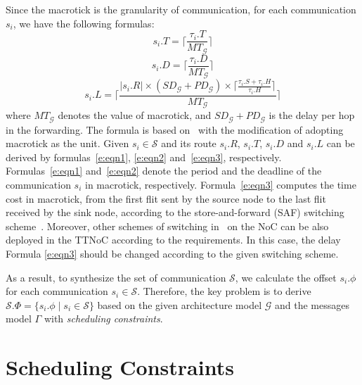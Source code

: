 \documentclass[journal]{IEEEtran}
\newcommand{\calG}{\mathcal{G}}
\newcommand{\calS}{\mathcal{S}}
\newcommand{\SD}{\mathit{SD}_\calG}
\newcommand{\HD}{\mathit{PD}_\calG}
\newcommand{\MT}{\mathit{MT}_\calG}
\theoremstyle{remark}
\begin{document}
Since the macrotick is the granularity of communication,
 for each communication $s_{i}$,
   we have the following formulas:
\begin{equation}
\label{e:eqn1}
  s_i.T = \lceil\frac{\tau_{i}.T}{\MT} \rceil
\end{equation}
\begin{equation}
\label{e:eqn2}
  s_i.D = \lceil\frac{\tau_{i}.D}{\MT}\rceil
\end{equation}
\begin{equation}
\label{e:eqn3}
  s_i.L = \lceil\frac{|s_i.R| \times (\SD+\HD) \times
    \lceil\frac{\tau_{i}.S + \tau_{i}.H}{\tau_{i}.H  }\rceil}{\MT}\rceil
\end{equation}   
where $\MT$ denotes the value of macrotick,
 and $\SD+\HD$ is the delay per hop in the forwarding.
The formula is based on~\cite{DBLP:books/daglib/0087651} with the modification of adopting macrotick as the unit.  
Given $s_{i}\in\calS$ and its route $s_i.R$,
 $s_i.T$,
  $s_i.D$ and $s_i.L$ can be derived by formulas~\ref{e:eqn1},
   \ref{e:eqn2} and~\ref{e:eqn3}, respectively.
Formulas~\ref{e:eqn1} and~\ref{e:eqn2} denote the period and the deadline of the communication $s_i$ in macrotick, respectively. 
Formula~\ref{e:eqn3} computes the time cost in
macrotick, from the first flit sent by the source node to the last
flit received by the sink node, according to the store-and-forward
(SAF) switching scheme~\cite{DBLP:books/daglib/0087651}.  
Moreover, other schemes of switching in~  \cite{DBLP:books/daglib/0087651} on the NoC can be also deployed in the TTNoC
according to the requirements. 
In this case, the delay Formula \ref{e:eqn3} should be changed according to the given switching scheme.

As a result, to synthesize the set of communication $\calS$,
 we calculate the offset $s_i.\phi$ for each communication $s_i\in\calS$.
Therefore,
 the key problem is to derive $\calS.\Phi = \{s_i.\phi\mid s_i\in\calS\}$ based on the given architecture model $\calG$ and the messages model $\Gamma$ with \emph{scheduling constraints}.


\section{Scheduling Constraints\label{s:constraint}}
\end{document}
